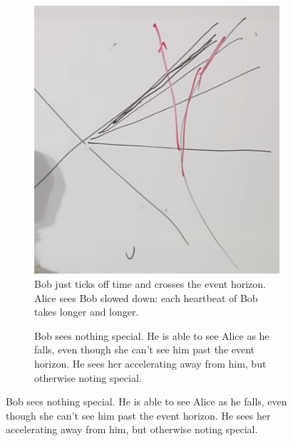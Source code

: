 \documentclass[]{article}
\begin{document}
{\begin{figure}[H]
	\caption{Alice throws Bob into the Black Hole}
	\begin{subfigure}[t]{0.3\textwidth}
		\caption{Bob just ticks off time and crosses the event horizon. Alice sees Bob slowed down: each heartbeat of Bob takes longer and longer.}\label{fig:gr-6-alice-bob}
		\includegraphics[width=\textwidth]{gr-6-alice-bob}
	\end{subfigure}
	\begin{subfigure}[t]{0.3\textwidth}
		\caption{Bob sees nothing special. He is able to see Alice as he falls, even though she can't see him past the event horizon. He sees her accelerating away from him, but otherwise noting special.}\label{fig:gr-6-bobs-perspective}

\end{subfigure}
\end{figure}}
\end{document}

